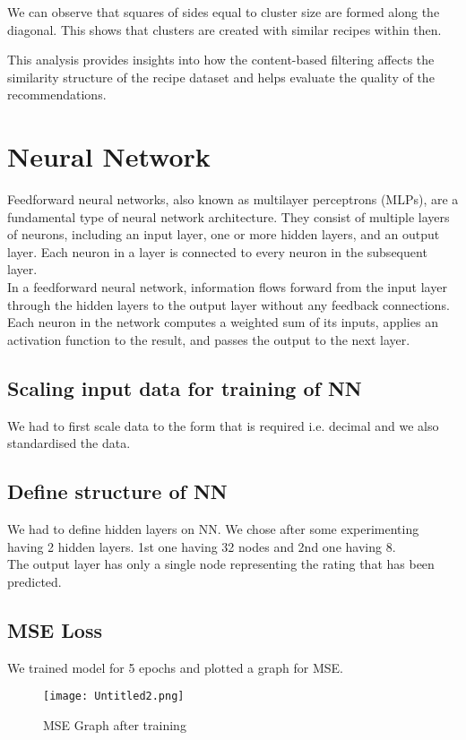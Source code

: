 \documentclass[conference]{IEEEtran}
\begin{document}
We can observe that squares of sides equal to cluster size are formed along the diagonal. This shows that clusters are created with similar recipes within then.

This analysis provides insights into how the content-based filtering affects the similarity structure of the recipe dataset and helps evaluate the quality of the recommendations.

\section{Neural Network}
Feedforward neural networks, also known as multilayer perceptrons (MLPs), are a fundamental type of neural network architecture. They consist of multiple layers of neurons, including an input layer, one or more hidden layers, and an output layer. Each neuron in a layer is connected to every neuron in the subsequent layer.
\\
In a feedforward neural network, information flows forward from the input layer through the hidden layers to the output layer without any feedback connections. Each neuron in the network computes a weighted sum of its inputs, applies an activation function to the result, and passes the output to the next layer.

\subsection{Scaling input data for training of NN}
We had to first scale data to the form that is required i.e. decimal and we also standardised the data.

\subsection{Define structure of NN}
We had to define hidden layers on NN. We chose after some experimenting having 2 hidden layers. 1st one having 32 nodes and 2nd one having 8. \\The output layer has only a single node representing the rating that has been predicted.

\subsection{MSE Loss}
We trained model for 5 epochs and plotted a graph for MSE.
\begin{figure}[H]
\centering
\texttt{[image: Untitled2.png]}
\caption{MSE Graph after training}
\label{fig:clustering}
\end{figure}
\end{document}
